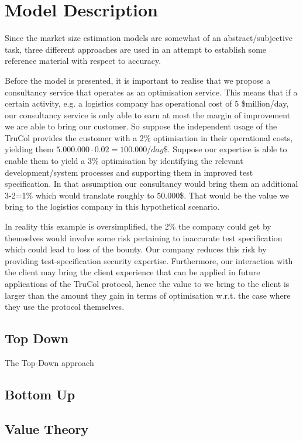 \section{Model Description}\label{sec:model_description}
Since the market size estimation models are somewhat of an abstract/subjective task, three different approaches are used in an attempt to establish some reference material with respect to accuracy. 

Before the model is presented, it is important to realise that we propose a consultancy service that operates as an optimisation service. This means that if a certain activity, e.g. a logistics company has operational cost of 5 \$million/day, our consultancy service is only able to earn at most the margin of improvement we are able to bring our customer. So suppose the independent usage of the TruCol provides the customer with a 2\% optimisation in their operational costs, yielding them $5.000.000\cdot 0.02=100.000/day$\$. Suppose our expertise is able to enable them to yield a 3\% optimisation by identifying the relevant development/system processes and supporting them in improved test specification. In that assumption our consultancy would bring them an additional 3-2=1\% which would translate roughly to $50.000$\$. That would be the value we bring to the logistics company in this hypothetical scenario.

In reality this example is oversimplified, the 2\% the company could get by themselves would involve some risk pertaining to inaccurate test specification which could lead to loss of the bounty. Our company reduces this risk by providing test-specification security expertise. Furthermore, our interaction with the client may bring the client experience that can be applied in future applications of the TruCol protocol, hence the value to we bring to the client is larger than the amount they gain in terms of optimisation w.r.t. the case where they use the protocol themselves.

\subsection{Top Down}\label{subsec:model_descriptions_top_down}
The Top-Down approach 
\subsection{Bottom Up}\label{subsec:model_descriptions_bottom_up}
\subsection{Value Theory}\label{subsec:model_descriptions_value_theory}